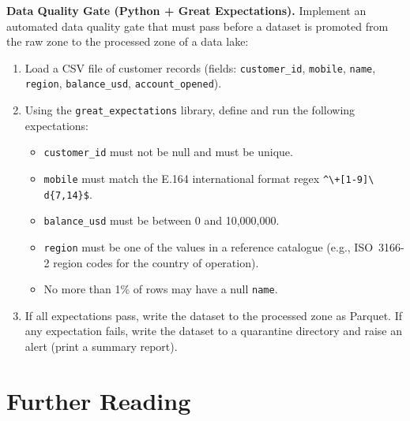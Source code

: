 \pe \textbf{Data Quality Gate (Python + Great Expectations).}
Implement an automated data quality gate that must pass before a dataset
is promoted from the raw zone to the processed zone of a data lake:
\begin{enumerate}[label=(\alph*)]
  \item Load a CSV file of customer records (fields: \texttt{customer\_id},
        \texttt{mobile}, \texttt{name}, \texttt{region}, \texttt{balance\_usd},
        \texttt{account\_opened}).
  \item Using the \texttt{great\_expectations} library, define and run
        the following expectations:
        \begin{itemize}
          \item \texttt{customer\_id} must not be null and must be unique.
          \item \texttt{mobile} must match the E.164 international format
                regex \texttt{\textasciicircum{}\textbackslash +[1-9]\textbackslash
                d\{7,14\}\$}.
          \item \texttt{balance\_usd} must be between 0 and 10{,}000{,}000.
          \item \texttt{region} must be one of the values in a reference
                catalogue (e.g., ISO~3166-2 region codes for the country
                of operation).
          \item No more than 1\% of rows may have a null \texttt{name}.
        \end{itemize}
  \item If all expectations pass, write the dataset to the processed zone
        as Parquet. If any expectation fails, write the dataset to a
        quarantine directory and raise an alert (print a summary report).
\end{enumerate}
\section*{Further Reading}
\label{sec:ch8-further}

